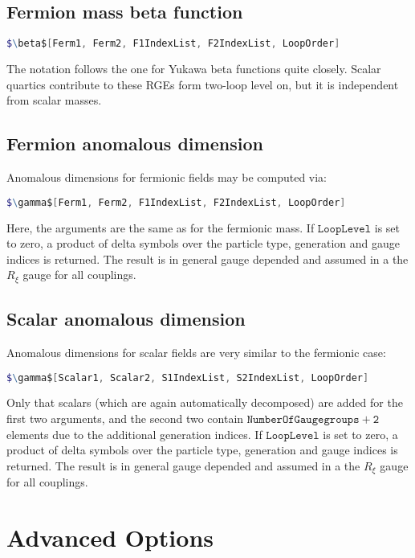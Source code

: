 \documentclass{scrartcl}
\begin{document}
\subsection{Fermion mass beta function}
\begin{lstlisting}[language=mathematica,mathescape,columns=flexible,backgroundcolor=\color{light-gray}]
$\beta$[Ferm1, Ferm2, F1IndexList, F2IndexList, LoopOrder]
\end{lstlisting}
The notation follows the one for Yukawa beta functions quite closely. Scalar quartics contribute to these RGEs form two-loop level on, but it is independent from scalar masses. \\
\subsection{Fermion anomalous dimension}
Anomalous dimensions for fermionic fields may be computed via:
\begin{lstlisting}[language=mathematica,mathescape,columns=flexible,backgroundcolor=\color{light-gray}]
$\gamma$[Ferm1, Ferm2, F1IndexList, F2IndexList, LoopOrder]
\end{lstlisting}
Here, the arguments are the same as for the fermionic mass. If $\mathtt{LoopLevel}$ is set to zero, a product of delta symbols over the particle type, generation and gauge indices is returned. The result is in general gauge depended and assumed in a the $R_\xi$ gauge for all couplings. \\ \FloatBarrier
\subsection{Scalar anomalous dimension}
Anomalous dimensions for scalar fields are very similar to the fermionic case:
\begin{lstlisting}[language=mathematica,mathescape,columns=flexible,backgroundcolor=\color{light-gray}]
$\gamma$[Scalar1, Scalar2, S1IndexList, S2IndexList, LoopOrder]
\end{lstlisting}
Only that scalars (which are again automatically decomposed) are added for the first two arguments, and the second two contain $\mathtt{NumberOfGaugegroups+2}$ elements due to the additional generation indices. If $\mathtt{LoopLevel}$ is set to zero, a product of delta symbols over the particle type, generation and gauge indices is returned. The result is in general gauge depended and assumed in a the $R_\xi$ gauge for all couplings. \\ \FloatBarrier
\newpage
\section{Advanced Options}
\end{document}
